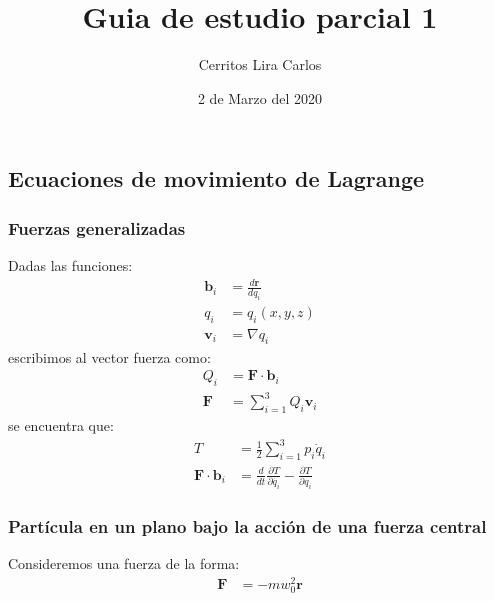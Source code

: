 \documentclass{article}
\title{Guia de estudio parcial 1}
\author{Cerritos Lira Carlos}
\date{2 de Marzo del 2020}
\begin{document}
\maketitle
\subsection*{Ecuaciones de movimiento de Lagrange}
\subsubsection*{Fuerzas generalizadas}
Dadas las funciones:
\begin{align*}
    \bm{b}_i &= \frac{d\bm{r}}{dq_i} \\
    q_i &= q_i(x,y,z) \\
    \bm{v}_i &= \nabla q_i
\end{align*}
escribimos al vector fuerza como:
\begin{align*}
    Q_i &= \bm{F} \cdot \bm{b}_i \\
    \bm{F} &= \sum_{i=1}^3 Q_i\bm{v}_i
\end{align*}
se encuentra que:
\begin{align*}
    T &= \frac{1}{2} \sum_{i=1}^3 p_i\dot{q}_i \\
    \bm{F} \cdot \bm{b}_i &= \frac{d}{dt}\frac{\partial T}{\partial \dot{q_i}} - \frac{\partial T}{\partial q_i}
\end{align*}
\begin{tcolorbox}[breakable]
    \subsubsection*{Partícula en un plano bajo la acción de una fuerza central}
    Consideremos una fuerza de la forma:
    \begin{align*}
        \bm{F} &= -mw_0^2\bm{r}
    \end{align*}
\end{tcolorbox}
\end{document}
